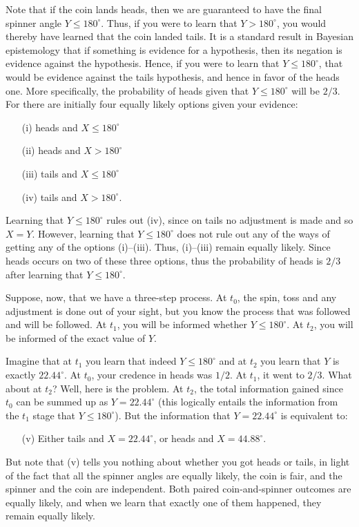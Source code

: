 Note that if the coin lands heads, then we are guaranteed to have the final spinner angle $Y \le 180^\circ$. Thus, if you were
to learn that $Y>180^\circ$, you would thereby have learned that the coin landed tails. It is a standard result in Bayesian
epistemology that if something is evidence for a hypothesis, then its negation is evidence against the hypothesis. Hence, if
you were to learn that $Y \le 180^\circ$, that would be evidence against the tails hypothesis, and hence in favor of the heads
one. More specifically, the probability of heads given that $Y\le 180^\circ$ will be $2/3$. For there are initially four equally
likely options given your evidence: 
\begin{enumerate}
\item[(i)] heads and $X\le 180^\circ$
\item[(ii)] heads and $X> 180^\circ$
\item[(iii)] tails and $X\le 180^\circ$
\item[(iv)] tails and $X> 180^\circ$.
\end{enumerate}
Learning that $Y\le 180^\circ$ rules out (iv), since on tails no adjustment is made and so $X=Y$. However, learning that
$Y\le 180^\circ$ does not rule out any of the ways of getting any of the options (i)--(iii). Thus, (i)--(iii) remain equally
likely. Since heads occurs on two of these three options, thus the probability of heads is $2/3$ after learning that $Y\le 180^\circ$.

Suppose, now, that we have a three-step process. At $t_0$, the spin, toss and any adjustment is done out of your sight, but you
know the process that was followed and will be followed. At $t_1$, you will be informed whether $Y \le 180^\circ$. At $t_2$, you will 
be informed of the exact value of $Y$.

Imagine that at $t_1$ you learn that indeed $Y \le 180^\circ$ and at $t_2$ you learn that $Y$ is exactly $22.44^\circ$. 
At $t_0$, your credence in heads was $1/2$. At $t_1$, it went to $2/3$. What about at $t_2$? Well, here is the problem.
At $t_2$, the total information gained since $t_0$ can be summed up as $Y=22.44^\circ$ (this logically entails the
information from the $t_1$ stage that $Y\le 180^\circ$). But the information that $Y=22.44^\circ$ is equivalent to:
\begin{enumerate} 
\item[(v)] Either tails and $X=22.44^\circ$, or heads and $X=44.88^\circ$.
\end{enumerate}
But note that (v) tells you nothing about whether you got heads or tails, in light of the fact that all the spinner angles are
equally likely, the coin is fair, and the spinner and the coin are independent. Both paired coin-and-spinner outcomes are equally
likely, and when we learn that exactly one of them happened, they remain equally likely.

